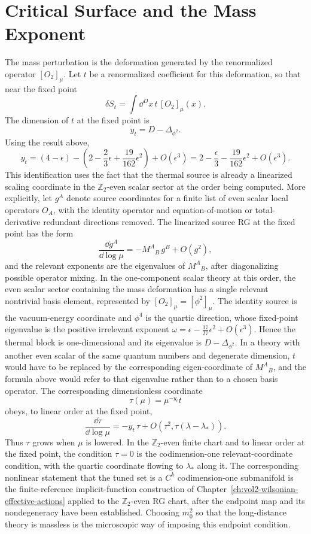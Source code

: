 \section{Critical Surface and the Mass Exponent}

The mass perturbation is the deformation generated by the renormalized
operator \([O_2]_\mu\).  Let \(t\) be a renormalized coefficient for this
deformation, so that near the fixed point
\[
  \delta S_t
  =
  \int \dd^D x\,t\, [O_2]_\mu(x).
\]
The dimension of \(t\) at the fixed point is
\[
  y_t
  =
  D-\Delta_{\phi^2}.
\]
Using the result above,
\[
  y_t
  =
  (4-\epsilon)
  -
  \left(
    2-\frac{2}{3}\epsilon
    +\frac{19}{162}\epsilon^2
  \right)
  +
  O(\epsilon^3)
  =
  2-\frac{\epsilon}{3}
  -\frac{19}{162}\epsilon^2
  +O(\epsilon^3).
\]
This identification uses the fact that the thermal source is already a
linearized scaling coordinate in the \(\mathbb Z_2\)-even scalar sector at the
order being computed.  More explicitly, let \(g^A\) denote source coordinates
for a finite list of even scalar local operators \(O_A\), with the identity
operator and equation-of-motion or total-derivative redundant directions
removed.  The linearized source RG at the fixed point has the form
\[
  \frac{\dd g^A}{\dd\log\mu}
  =
  -M^A{}_B\,g^B+O(g^2),
\]
and the relevant exponents are the eigenvalues of \(M^A{}_B\), after
diagonalizing possible operator mixing.  In the one-component scalar theory at
this order, the even scalar sector containing the mass deformation has a single
relevant nontrivial basis element, represented by \([O_2]_\mu=[\phi^2]_\mu\).
The identity source is the vacuum-energy coordinate and \(\phi^4\) is the
quartic direction, whose fixed-point eigenvalue is the positive irrelevant
exponent \(\omega=\epsilon-\frac{17}{27}\epsilon^2+O(\epsilon^3)\).  Hence the
thermal block is one-dimensional and its eigenvalue is \(D-\Delta_{\phi^2}\).
In a theory with another even scalar of the same
quantum numbers and degenerate dimension, \(t\) would have to be replaced by
the corresponding eigen-coordinate of \(M^A{}_B\), and the formula above would
refer to that eigenvalue rather than to a chosen basis operator.
The corresponding dimensionless coordinate
\[
  \tau(\mu)=\mu^{-y_t}t
\]
obeys, to linear order at the fixed point,
\[
  \frac{\dd\tau}{\dd\log\mu}
  =
  -y_t\,\tau+O(\tau^2,\tau(\lambda-\lambda_*)).
\]
Thus \(\tau\) grows when \(\mu\) is lowered.  In the \(\mathbb Z_2\)-even
finite chart and to linear order at the fixed point, the condition
\(\tau=0\) is the codimension-one relevant-coordinate condition, with the
quartic coordinate flowing to \(\lambda_*\) along it.  The corresponding
nonlinear statement that the tuned set is a \(C^k\) codimension-one
submanifold is the finite-reference implicit-function construction of
Chapter~\ref{ch:vol2-wilsonian-effective-actions} applied to the
\(\mathbb Z_2\)-even RG chart, after the endpoint map and its nondegeneracy
have been established.  Choosing \(m_0^2\) so that the long-distance theory is
massless is the microscopic way of imposing this endpoint condition.

